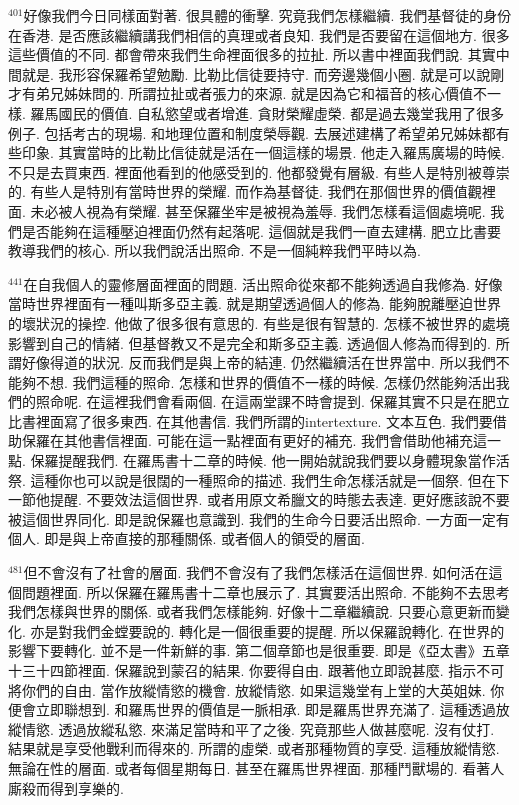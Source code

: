 \documentclass{book}
\begin{document}
$^{401}$好像我們今日同樣面對著.
很具體的衝擊.
究竟我們怎樣繼續.
我們基督徒的身份在香港.
是否應該繼續講我們相信的真理或者良知.
我們是否要留在這個地方.
很多這些價值的不同.
都會帶來我們生命裡面很多的拉扯.
所以書中裡面我們說.
其實中間就是.
我形容保羅希望勉勵.
比勒比信徒要持守.
而旁邊幾個小圈.
就是可以說剛才有弟兄姊妹問的.
所謂拉扯或者張力的來源.
就是因為它和福音的核心價值不一樣.
羅馬國民的價值.
自私慾望或者增進.
貪財榮耀虛榮.
都是過去幾堂我用了很多例子.
包括考古的現場.
和地理位置和制度榮辱觀.
去展述建構了希望弟兄姊妹都有些印象.
其實當時的比勒比信徒就是活在一個這樣的場景.
他走入羅馬廣場的時候.
不只是去買東西.
裡面他看到的他感受到的.
他都發覺有層級.
有些人是特別被尊崇的.
有些人是特別有當時世界的榮耀.
而作為基督徒.
我們在那個世界的價值觀裡面.
未必被人視為有榮耀.
甚至保羅坐牢是被視為羞辱.
我們怎樣看這個處境呢.
我們是否能夠在這種壓迫裡面仍然有起落呢.
這個就是我們一直去建構.
肥立比書要教導我們的核心.
所以我們說活出照命.
不是一個純粹我們平時以為.

$^{441}$在自我個人的靈修層面裡面的問題.
活出照命從來都不能夠透過自我修為.
好像當時世界裡面有一種叫斯多亞主義.
就是期望透過個人的修為.
能夠脫離壓迫世界的壞狀況的操控.
他做了很多很有意思的.
有些是很有智慧的.
怎樣不被世界的處境影響到自己的情緒.
但基督教又不是完全和斯多亞主義.
透過個人修為而得到的.
所謂好像得道的狀況.
反而我們是與上帝的結連.
仍然繼續活在世界當中.
所以我們不能夠不想.
我們這種的照命.
怎樣和世界的價值不一樣的時候.
怎樣仍然能夠活出我們的照命呢.
在這裡我們會看兩個.
在這兩堂課不時會提到.
保羅其實不只是在肥立比書裡面寫了很多東西.
在其他書信.
我們所謂的intertexture.
文本互色.
我們要借助保羅在其他書信裡面.
可能在這一點裡面有更好的補充.
我們會借助他補充這一點.
保羅提醒我們.
在羅馬書十二章的時候.
他一開始就說我們要以身體現象當作活祭.
這種你也可以說是很闊的一種照命的描述.
我們生命怎樣活就是一個祭.
但在下一節他提醒.
不要效法這個世界.
或者用原文希臘文的時態去表達.
更好應該說不要被這個世界同化.
即是說保羅也意識到.
我們的生命今日要活出照命.
一方面一定有個人.
即是與上帝直接的那種關係.
或者個人的領受的層面.

$^{481}$但不會沒有了社會的層面.
我們不會沒有了我們怎樣活在這個世界.
如何活在這個問題裡面.
所以保羅在羅馬書十二章也展示了.
其實要活出照命.
不能夠不去思考我們怎樣與世界的關係.
或者我們怎樣能夠.
好像十二章繼續說.
只要心意更新而變化.
亦是對我們金螳要說的.
轉化是一個很重要的提醒.
所以保羅說轉化.
在世界的影響下要轉化.
並不是一件新鮮的事.
第二個章節也是很重要.
即是《亞太書》五章十三十四節裡面.
保羅說到蒙召的結果.
你要得自由.
跟著他立即說甚麼.
指示不可將你們的自由.
當作放縱情慾的機會.
放縱情慾.
如果這幾堂有上堂的大英姐妹.
你便會立即聯想到.
和羅馬世界的價值是一脈相承.
即是羅馬世界充滿了.
這種透過放縱情慾.
透過放縱私慾.
來滿足當時和平了之後.
究竟那些人做甚麼呢.
沒有仗打.
結果就是享受他戰利而得來的.
所謂的虛榮.
或者那種物質的享受.
這種放縱情慾.
無論在性的層面.
或者每個星期每日.
甚至在羅馬世界裡面.
那種鬥獸場的.
看著人廝殺而得到享樂的.
\end{document}
